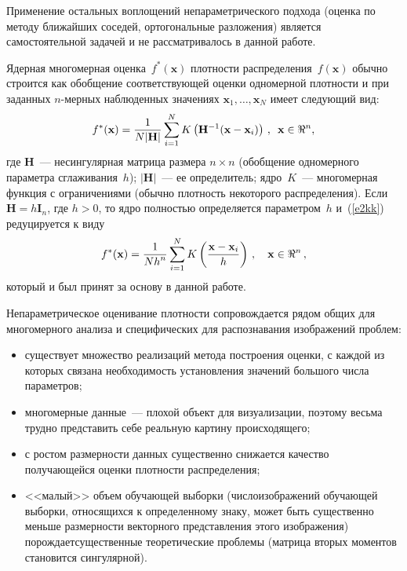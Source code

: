 \begin{multicols}{2}
Применение остальных воплощений непараметрического подхода (оценка по методу ближайших 
соседей, ортогональные разложения) является самостоятельной задачей и не рассматривалось в 
данной работе. 
      
      Ядерная многомерная оценка~$f^*(\mathbf{x})$ плотности распределения~$f(\mathbf{x})$  
обычно строится как обобщение соответствующей оценки одномерной плот\-ности и при заданных 
$n$-мер\-ных наблюденных значениях  $\mathbf{x}_1,\ldots , \mathbf{x}_N$ имеет следующий 
вид:
      \begin{equation}
     f^*(\mathbf{x}) =\displaystyle\frac{\displaystyle 1\mathstrut}{\displaystyle N\vert \mathbf{H}\vert\mathstrut}\sum\limits_{i=1}^N K\left ( \mathbf{H}^{-
1}(\mathbf{x}-\mathbf{x}_i)\right )\,,\enskip \mathbf{x}\in \Re^n,
      \label{e2kk}
      \end{equation}
где \textbf{H}~--- несингулярная матрица размера $n\times n$ (обобщение одномерного параметра 
сглаживания~$h$);  $\vert \mathbf{H}\vert$~--- ее определитель; ядро~$K$~--- многомерная 
функция с ограничениями (обычно плотность некоторого распределения). Если 
$\mathbf{H}=h\mathbf{I}_n$, где $h>0$, то ядро полностью определяется параметром~$h$ 
и~(\ref{e2kk}) редуцируется к виду
\begin{equation*}
f^*(\mathbf{x}) =\displaystyle\frac{\displaystyle 1\mathstrut}{\displaystyle Nh^n\mathstrut}\sum\limits_{i=1}^N K\left(\displaystyle\frac{\displaystyle \mathbf{x}-\mathbf{x}_i\mathstrut}{\displaystyle h\mathstrut}\right)\,,\quad 
\mathbf{x}\in \Re^n\,,
\end{equation*}
который и был принят за основу в данной работе.

      Непараметрическое оценивание плотности сопровождается рядом общих для многомерного 
анализа и специфических для распознавания изображений проблем:
      \begin{itemize}
\item существует множество реализаций метода построения оценки, с каждой из которых связана 
необходимость установления значений большого числа параметров;
\item многомерные данные~--- плохой объект для визуализации, поэтому весьма трудно 
представить себе реальную картину происходящего;
\item с ростом размерности данных существенно снижается качество получающейся оценки 
плотности распределения;
\item <<малый>> объем обучающей выборки (число\linebreak изображений обучающей выборки, 
относящихся к определенному знаку, может быть существенно меньше размерности векторного 
представления этого изображения) порождает\linebreak существенные теоретические проблемы (мат\-ри\-ца 
вторых моментов становится сингулярной).
\end{itemize}


\end{multicols}
